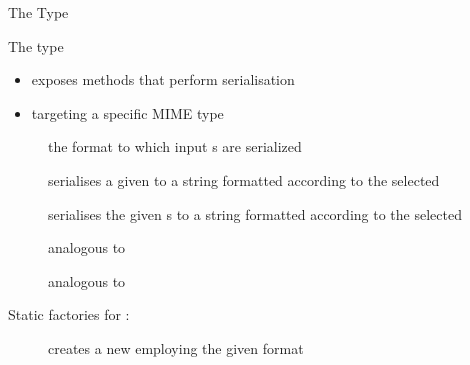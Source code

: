 \documentclass[handout]{beamer}
\begin{document}
\begin{frame}[allowframebreaks]{The  Type}

    \begin{block}{The  type}
        \begin{itemize}
            \item exposes methods that perform  serialisation
            \item targeting a specific MIME type
        \end{itemize}
    \end{block}
    \begin{description}
        \item [] the format to which input s are serialized 
        \item [] serialises a given  to a string formatted according to the selected 
        \item [] serialises the given s to a string formatted according to the selected 
        \item [] analogous to 
        \item [] analogous to 
    \end{description}

    \framebreak

    Static factories for :
    \begin{description}
        \item [] creates a new  employing the given format
    \end{description}

\end{frame}
\end{document}

